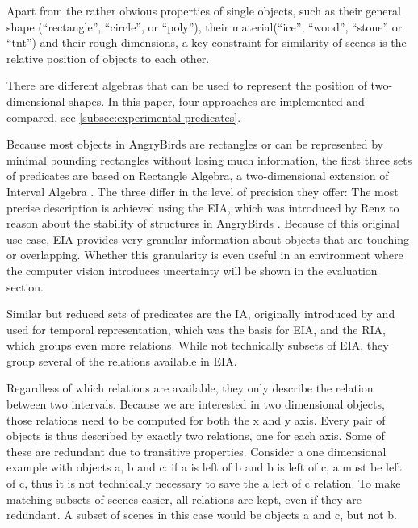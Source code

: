 Apart from the rather obvious properties of single objects, such as their general shape (``rectangle'', ``circle'', or ``poly''), their material(``ice'', ``wood'', ``stone'' or ``tnt'') and their rough dimensions, a key constraint for similarity of scenes is the relative position of objects to each other.

There are different algebras that can be used to represent the position of two-dimensional shapes. In this paper, four approaches are implemented and compared, see \ref{subsec:experimental-predicates}.

Because most objects in AngryBirds are rectangles or can be represented by minimal bounding rectangles without losing much information, the first three sets of predicates are based on Rectangle Algebra, a two-dimensional extension of Interval Algebra \cite{Balbiani1999ANT}. The three differ in the level of precision they offer:
The most precise description is achieved using the \ac{EIA}, which was introduced by Renz to reason about the stability of structures in AngryBirds \cite{Renz-ERA}. Because of this original use case, \ac{EIA} provides very granular information about objects that are touching or overlapping.
Whether this granularity is even useful in an environment where the computer vision introduces uncertainty will be shown in the evaluation section.

Similar but reduced sets of predicates are the \ac{IA}, originally introduced by \cite{Allen-10.1145/182.358434} and used for temporal representation, which was the basis for \ac{EIA}, and the \ac{RIA}, which groups even more relations. While not technically subsets of EIA, they group several of the relations available in EIA.



Regardless of which relations are available, they only describe the relation between two intervals. Because we are interested in two dimensional objects, those relations need to be computed for both the x and y axis. Every pair of objects is thus described by exactly two relations, one for each axis. Some of these are redundant due to transitive properties.
Consider a one dimensional example with objects a, b and c: if a is left of b and b is left of c, a must be left of c, thus it is not technically necessary to save the a left of c relation.
To make matching subsets of scenes easier, all relations are kept, even if they are redundant. A subset of scenes in this case would be objects a and c, but not b.

